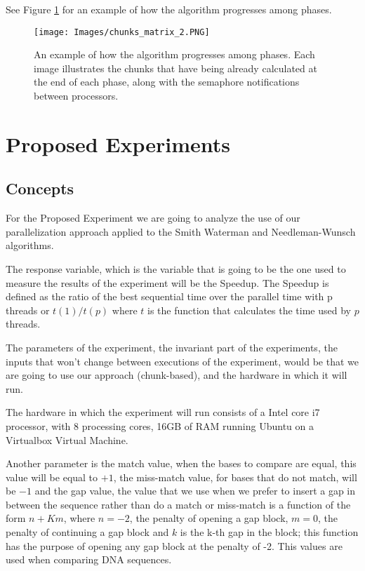\documentclass[journal]{IEEEtran}
\begin{document}
See Figure \ref{exec_2} for an example of how the algorithm progresses among phases.

\begin{figure}[h]
  \begin{center}
    \texttt{[image: Images/chunks\_matrix\_2.PNG]}
  \end{center}
  \caption{An example of how the algorithm progresses among phases. Each image illustrates the chunks that have being already calculated at the end of each phase, along with the semaphore notifications between processors.}
  \label{exec_2}
\end{figure}

\section{Proposed Experiments}


\subsection{Concepts}

For the Proposed Experiment we are going to analyze the use of our parallelization approach applied to the Smith Waterman and Needleman-Wunsch algorithms.

The response variable, which is the variable that is going to be the one used to measure the results of the experiment will be the Speedup. The Speedup is defined as the ratio of the best sequential time over the parallel time with p threads or $t(1)/t(p)$ where $t$ is the function that calculates the time used by $p$ threads.

The parameters of the experiment, the invariant part of the experiments, the inputs that won't change between executions of the experiment, would be that we are going to use our approach (chunk-based), and the hardware in which it will run.

The hardware in which the experiment will run consists of a Intel core i7 processor, with 8 processing cores, 16GB of RAM running Ubuntu on a Virtualbox Virtual Machine.

Another parameter is the match value, when the bases to compare are equal, this value will be equal to $+1$, the miss-match value, for bases that do not match, will be $-1$ and the gap value, the value that we use when we prefer to insert a gap in between the sequence rather than do a match or miss-match is a function of the form $n + Km$, where $n = -2$, the penalty of opening a gap block, $m = 0$, the penalty of continuing a gap block and $k$ is the k-th gap in the block; this function has the purpose of opening any gap block at the penalty of -2. This values are used when comparing DNA sequences.
\end{document}
